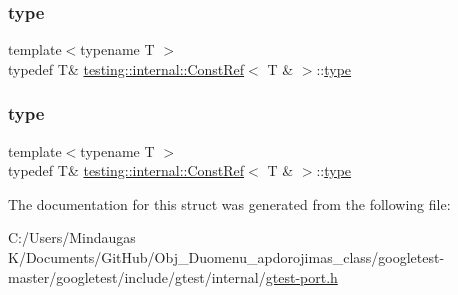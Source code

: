 \mbox{\label{structtesting_1_1internal_1_1_const_ref_3_01_t_01_6_01_4_a9f664dd25649a0d260cfb1f610c7a349}} 
\subsubsection{\texorpdfstring{type}{type}\hspace{0.1cm}{\footnotesize\ttfamily [2/3]}}
{\footnotesize\ttfamily template$<$typename T $>$ \\
typedef T\& \mbox{\hyperlink{structtesting_1_1internal_1_1_const_ref}{testing\+::internal\+::\+Const\+Ref}}$<$ T \& $>$\+::\mbox{\hyperlink{structtesting_1_1internal_1_1_const_ref_3_01_t_01_6_01_4_a9f664dd25649a0d260cfb1f610c7a349}{type}}}

\mbox{\label{structtesting_1_1internal_1_1_const_ref_3_01_t_01_6_01_4_a9f664dd25649a0d260cfb1f610c7a349}} 
\subsubsection{\texorpdfstring{type}{type}\hspace{0.1cm}{\footnotesize\ttfamily [3/3]}}
{\footnotesize\ttfamily template$<$typename T $>$ \\
typedef T\& \mbox{\hyperlink{structtesting_1_1internal_1_1_const_ref}{testing\+::internal\+::\+Const\+Ref}}$<$ T \& $>$\+::\mbox{\hyperlink{structtesting_1_1internal_1_1_const_ref_3_01_t_01_6_01_4_a9f664dd25649a0d260cfb1f610c7a349}{type}}}



The documentation for this struct was generated from the following file\+:\begin{DoxyCompactItemize}
\item 
C\+:/\+Users/\+Mindaugas K/\+Documents/\+Git\+Hub/\+Obj\+\_\+\+Duomenu\+\_\+apdorojimas\+\_\+class/googletest-\/master/googletest/include/gtest/internal/\mbox{\hyperlink{googletest-master_2googletest_2include_2gtest_2internal_2gtest-port_8h}{gtest-\/port.\+h}}\end{DoxyCompactItemize}

